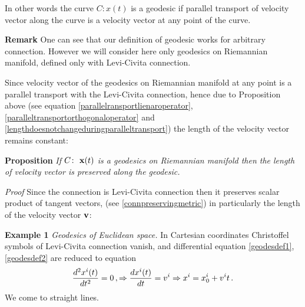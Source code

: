 \documentclass[12pt]{article}
\theoremstyle{theorem}
\numberwithin{equation}{section}
\begin{document}
{In other words the curve $C\colon x(t)$ is a geodesic 
if parallel transport of velocity vector 
along the curve is  a velocity vector at any point of the curve.
\m

{\bf Remark}  One can see that our definition of geodesic works 
for arbitrary connection. However we will consider here
only geodesics on Riemannian manifold,
defined only with Levi-Civita connection.

\m

Since velocity vector of the geodesics on Riemannian manifold  
at any point is a parallel transport
with the Levi-Civita connection, hence due to Proposition 
above (see equation \eqref{parallelransportlienaroperator},
\eqref{paralleltransportorthogonaloperator}  and
\eqref{lengthdoesnotchangeduringparalleltransport})
the length of the velocity vector remains constant:

{\bf Proposition}   {\it If $C \colon\,\, {\bf x}(t)$ is a 
geodesics on Riemannian manifold then the length of
velocity vector is preserved along the geodesic.}


{\sl Proof}   Since the connection is Levi-Civita connection then it
preserves scalar product of tangent vectors,
(see \eqref{connpreservingmetric}) in particularly the length
of the velocity vector ${\bf v}$:

\m

{\bf Example 1}  {\it Geodesics of Euclidean space.}
 In Cartesian coordinates
Christoffel symbols of Levi-Civita connection vanish, and differential equation
\eqref{geodesdef1}, \eqref{geodesdef2} are reduced to equation
  \begin{equation}\label{geodesicstraightlines2}
    {d^2x^i(t)\over dt^2}=0\,,\Rightarrow {dx^i(t)\over dt}=v^i \Rightarrow x^i=x^i_0+v^it\,.
  \end{equation}
We come to straight lines.

  \m



}
\end{document}
